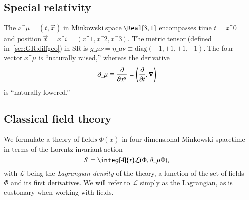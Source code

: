 



\subsection{Special relativity}
    The  $x\^\mu=(t, \vec{x})$ in Minkowski space $\Real[3,1]$ encompasses time $t=x\^0$ and position $\vec{x}=x\^i= (x\^1, x\^2, x\^3)$. The {metric tensor} (defined in~\cref{sec:GR:diffgeo}) in SR is $g\_{\mu\nu}= \eta\_{\mu\nu} \equiv \text{diag} (-1,+1,+1,+1)$. The four-vector $x\^\mu$ is ``naturally raised,'' whereas the derivative
    \begin{equation}
        \partial\_\mu \equiv \pdv{}{x\^\mu} =\pclosed{ \pdv{}{t}, \vec{\nabla} }
    \end{equation}
    is ``naturally lowered.'' 





\subsection{Classical field theory}
    We formulate a theory of field\emph{s} $\Phi(x)$ in four-dimensional Minkowski spacetime in terms of the Lorentz invariant action
    \begin{equation}
        S = \integ[4]{x} \mathcal{L}(\Phi, \partial\_\mu \Phi),
    \end{equation}
    with $\mathcal{L}$ being the \emph{Lagrangian density} of the theory, a function of the set of fields $\Phi$ and its first derivatives. We will refer to $\mathcal{L}$ simply as the Lagrangian, as is customary when working with fields. 

